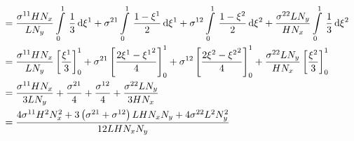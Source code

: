 \begin{equation}
\begin{aligned}
    &=\dfrac{\conductivitytensorsymbol^{11} H N_{x}}{L N_{y}}\gint{0}{1}{\dfrac{1}{3}}{\xione}
    +\conductivitytensorsymbol^{21}\gint{0}{1}{\dfrac{1-\xione}{2}}{\xione}
    +\conductivitytensorsymbol^{12}\gint{0}{1}{\dfrac{1-\xitwo}{2}}{\xitwo}
    +\dfrac{\conductivitytensorsymbol^{22} L N_{y}}{H N_{x}}\gint{0}{1}{\dfrac{1}{3}}{\xitwo} \\
    &=\dfrac{\conductivitytensorsymbol^{11} H N_{x}}{L N_{y}}\sqbrac{\dfrac{\xione}{3}}^{1}_{0}
    +\conductivitytensorsymbol^{21}\sqbrac{\dfrac{2\xione-\xionesq}{4}}^{1}_{0}
    +\conductivitytensorsymbol^{12}\sqbrac{\dfrac{2\xitwo-\xitwosq}{4}}^{1}_{0}
    +\dfrac{\conductivitytensorsymbol^{22} L N_{y}}{H N_{x}}\sqbrac{\dfrac{\xitwo}{3}}^{1}_{0} \\
    &=\dfrac{\conductivitytensorsymbol^{11} H N_{x}}{3 L N_{y}}+\dfrac{\conductivitytensorsymbol^{21}}{4}+
    \dfrac{\conductivitytensorsymbol^{12}}{4}+\dfrac{\conductivitytensorsymbol^{22} L N_{y}}{3 H N_{x}} \\
    &=\dfrac{4\conductivitytensorsymbol^{11}H^{2}N_{x}^{2}+3\pbrac{\conductivitytensorsymbol^{21}+
        \conductivitytensorsymbol^{12}}L H N_{x} N_{y}+4\conductivitytensorsymbol^{22}L^{2}N_{y}^{2}}{12 L H N_{x} N_{y}}
  \end{aligned}
\end{equation}

